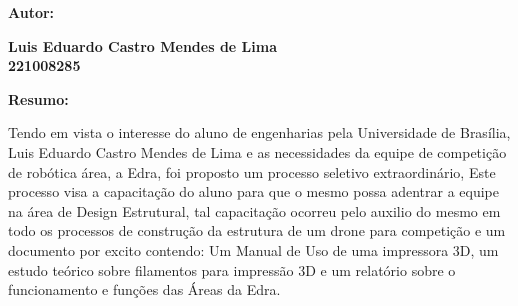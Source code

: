 \textbf{\Large Autor:}\\[0.6 cm]
\begin{center}
    \textbf{\medium Luis Eduardo Castro Mendes de Lima}\\[0.3cm]
    \textbf{\Large 221008285}\\[1.0cm]
\end{center}
\textbf{\Large Resumo:}
\begin{center}

    Tendo em vista o interesse do aluno de engenharias pela Universidade de Brasília, Luis Eduardo Castro Mendes de Lima e as necessidades da equipe de competição de robótica área, a Edra, foi proposto um processo seletivo extraordinário, Este processo visa a capacitação do aluno para que o mesmo possa adentrar a equipe na área de Design Estrutural, tal capacitação ocorreu pelo auxilio do mesmo em todo os processos de construção da estrutura de um drone para competição e um documento por excito contendo: Um Manual de Uso de uma impressora 3D, um estudo teórico sobre filamentos para impressão 3D e um relatório sobre o funcionamento e funções das Áreas da Edra.
\end{center}
